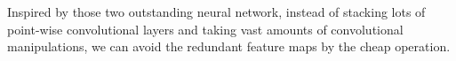 Inspired by those two outstanding neural network\cite{19}\cite{20}, instead of stacking lots of point-wise convolutional layers and taking vast amounts of convolutional manipulations, we can avoid the redundant feature maps by the cheap operation. 

